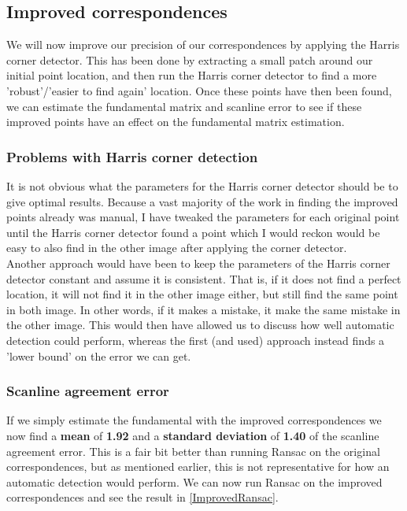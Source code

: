 \subsection{Improved correspondences}
We will now improve our precision of our correspondences by applying the Harris corner detector. This has been done by extracting a small patch around our initial point location, and then run the Harris corner detector to find a more 'robust'/'easier to find again' location. Once these  points have then been found, we can estimate the fundamental matrix and scanline error to see if these improved points have an effect on the fundamental matrix estimation.

\subsubsection{Problems with Harris corner detection}
It is not obvious what the parameters for the Harris corner detector should be to give optimal results. Because a vast majority of the work in finding the improved points already was manual, I have tweaked the parameters for each original point until the Harris corner detector found a point which I would reckon would be easy to also find in the other image after applying the corner detector.\\
Another approach would have been to keep the parameters of the Harris corner detector constant and assume it is consistent. That is, if it does not find a perfect location, it will not find it in the other image either, but still find the same point in both image. In other words, if it makes a mistake, it make the same mistake in the other image. This would then have allowed us to discuss how well automatic detection could perform, whereas the first (and used) approach instead finds a 'lower bound' on the error we can get.

\subsubsection{Scanline agreement error}
If we simply estimate the fundamental with the improved correspondences we now find a \textbf{mean} of \textbf{1.92} and a \textbf{standard deviation} of \textbf{1.40} of the scanline agreement error. This is a fair bit better than running Ransac on the original correspondences, but as mentioned earlier, this is not representative for how an automatic detection would perform. We can now run Ransac on the improved correspondences and see the result in \autoref{ImprovedRansac}.

